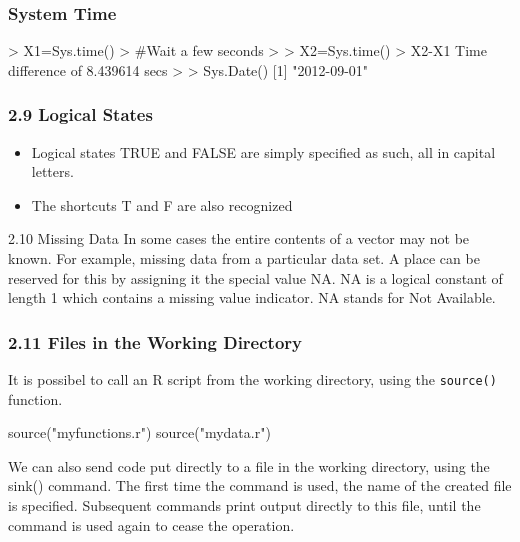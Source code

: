  
 
 \frametitle{System Time}
 \begin{framed}
 \begin{semiverbatim}
 > X1=Sys.time()
 > #Wait a few seconds
 >
 > X2=Sys.time()
 > X2-X1 Time difference of 8.439614 secs
 >
 > Sys.Date() [1] "2012-09-01"
 \end{semiverbatim}
 \end{framed}
 
 
 \frametitle{2.9 Logical States}
 \begin{itemize}
 \item Logical states TRUE and FALSE are simply specified as such, all in capital letters. 
 \item The
 shortcuts T and F are also recognized
 \end{itemize}
 
 
 
 
 2.10 Missing Data
 In some cases the entire contents of a vector may not be known. For example, missing data
 from a particular data set. A place can be reserved for this by assigning it the special value
 NA.
 NA is a logical constant of length 1 which contains a missing value indicator. NA stands
 for Not Available.
 
 
 
 
 \frametitle{2.11 Files in the Working Directory}
 It is possibel to call an R script from the working directory, using the \texttt{source()} function.
 \begin{framed}
 \begin{semiverbatim}
 source("myfunctions.r")
 source("mydata.r")
 \end{semiverbatim}
 \end{framed}
 We can also send code put directly to a file in the working directory, using the sink()
 command. The first time the command is used, the name of the created file is specified.
 Subsequent commands print output directly to this file, until the command is used again to
 cease the operation.
 
 
